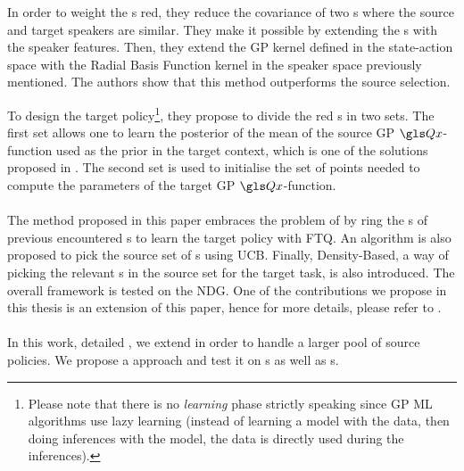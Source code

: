 In order to weight the s red, they reduce the covariance of two s where the source and target speakers are similar. They make it possible by extending the s with the speaker features. Then, they extend the \gls{GP} kernel defined in the state-action space with the Radial Basis Function kernel in the speaker space previously mentioned. The authors show that this method outperforms the source selection.

To design the target policy\footnote{Please note that there is no \textit{learning} phase strictly speaking since \gls{GP} \gls{ML} algorithms use lazy learning (instead of learning a model with the data, then doing inferences with the model, the data is directly used during the inferences).}, they propose to divide the red s in two sets. The first set allows one to learn the posterior of the mean of the source \gls{GP} $\Q$-function used as the prior in the target context, which is one of the solutions proposed in \textcite{Gasic2013}. The second set is used to initialise the set of points needed to compute the parameters of the target \gls{GP} $\Q$-function.

\paragraph{\cite{Genevay2016}} The method proposed in this paper embraces the problem of   by ring the s of previous encountered s to learn the target policy with \gls{FTQ}. An algorithm is also proposed to pick the source set of s using \gls{UCB}. Finally, Density-Based, a way of picking the relevant s in the source set for the target task, is also introduced. The overall framework is tested on the \acrfull{NDG}. One of the contributions we propose in this thesis is an extension of this paper, hence for more details, please refer to .

\paragraph{\cite{carrara2017online}} In this work, detailed , we extend \textcite{Genevay2016} in order to handle a larger pool of source policies. We propose a  approach and test it on s as well as s.


